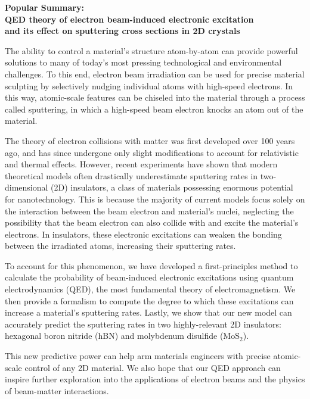 \documentclass{article}
\begin{document}
\begin{center}
  \large{\textbf{
    Popular Summary: \\
    QED theory of electron beam-induced electronic excitation \\
    and its effect on sputtering cross sections in 2D crystals
}}
\end{center}

The ability to control a material's structure atom-by-atom can provide
powerful solutions to many of today’s most pressing technological and
environmental challenges.
To this end, electron beam irradiation can be used for precise material
sculpting by selectively nudging individual atoms with high-speed electrons.
In this way, atomic-scale features can be chiseled into the material through a
process called sputtering, in which a high-speed beam electron knocks an atom
out of the material.

The theory of electron collisions with matter was first developed over 100
years ago, and has since undergone only slight modifications to account for
relativistic and thermal effects.
However, recent experiments have shown that modern theoretical models often
drastically underestimate sputtering rates in two-dimensional (2D) insulators,
a class of materials possessing enormous potential for nanotechnology.
This is because the majority of current models focus solely on the interaction
between the beam electron and material's nuclei, neglecting the possibility that
the beam electron can also collide with and excite the material's electrons.
In insulators, these electronic excitations can weaken the bonding between the
irradiated atoms, increasing their sputtering rates.

To account for this phenomenon, we have developed a first-principles method to
calculate the probability of beam-induced electronic excitations using quantum
electrodynamics (QED), the most fundamental theory of electromagnetism.
We then provide a formalism to compute the degree to which these excitations
can increase a material's sputtering rates.
Lastly, we show that our new model can accurately predict the sputtering rates
in two highly-relevant 2D insulators: hexagonal boron nitride (hBN) and
molybdenum disulfide (MoS$_2$).

This new predictive power can help arm materials engineers with precise
atomic-scale control of any 2D material.
We also hope that our QED approach can inspire further exploration into the
applications of electron beams and the physics of beam-matter interactions.
\end{document}
